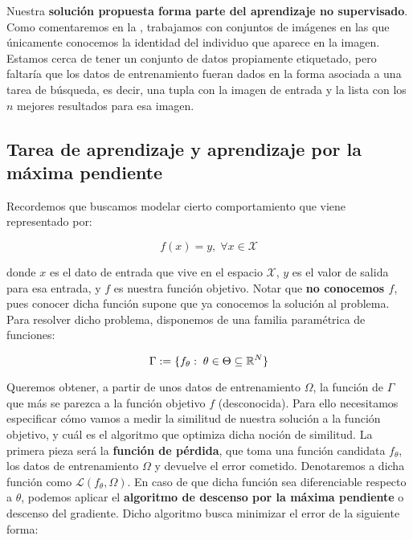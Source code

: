 Nuestra \textbf{solución propuesta forma parte del aprendizaje no supervisado}. Como comentaremos en la , trabajamos con conjuntos de imágenes en las que únicamente conocemos la identidad del individuo que aparece en la imagen. Estamos cerca de tener un conjunto de datos propiamente etiquetado, pero faltaría que los datos de entrenamiento fueran dados en la forma asociada a una tarea de búsqueda, es decir, una tupla con la imagen de entrada y la lista con los $n$ mejores resultados para esa imagen.

\subsection{Tarea de aprendizaje y aprendizaje por la máxima pendiente}

Recordemos que buscamos modelar cierto comportamiento que viene representado por:

\begin{equation}
    f(x) = y, \; \forall x \in \mathcal{X}
\end{equation}

donde $x$ es el dato de entrada que vive en el espacio $\mathcal{X}$, $y$ es el valor de salida para esa entrada, y $f$ es nuestra función objetivo. Notar que \textbf{no conocemos $f$}, pues conocer dicha función supone que ya conocemos la solución al problema. Para resolver dicho problema, disponemos de una familia paramétrica de funciones:

\begin{equation}
    \Gamma := \{ f_{\theta}: \; \theta \in \Theta \subseteq \mathbb{R}^N  \}
\end{equation}

Queremos obtener, a partir de unos datos de entrenamiento $\Omega$, la función de $\Gamma$ que más se parezca a la función objetivo $f$ (desconocida). Para ello necesitamos especificar cómo vamos a medir la similitud de nuestra solución a la función objetivo, y cuál es el algoritmo que optimiza dicha noción de similitud. La primera pieza será la \textbf{función de pérdida}, que toma una función candidata $f_{\theta}$, los datos de entrenamiento $\Omega$ y devuelve el error cometido. Denotaremos a dicha función como $\mathcal{L}(f_\theta, \Omega)$. En caso de que dicha función sea diferenciable respecto a $\theta$, podemos aplicar el \textbf{algoritmo de descenso por la máxima pendiente} o descenso del gradiente. Dicho algoritmo busca minimizar el error de la siguiente forma:

